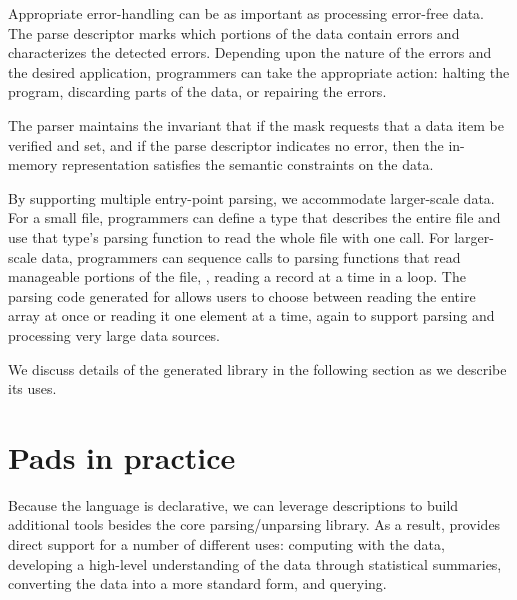 \documentclass{sig-alternate}
\begin{document}
Appropriate error-handling can be as important as processing
error-free data.  The parse descriptor marks which portions of the
data contain errors and characterizes the detected errors.
Depending upon the nature of the errors and the desired application,
programmers can take the appropriate action: halting the program,
discarding parts of the data, or repairing the errors.

The parser maintains the invariant that if the mask requests
that a data item be verified and set, and if the parse descriptor
indicates no error, then the in-memory representation satisfies the
semantic constraints on the data.

By supporting multiple entry-point parsing, we accommodate larger-scale data.
For a small file, programmers can define a \pads{} type that describes
the entire file and use that type's parsing function to read the whole
file with one call.  For larger-scale data, programmers can sequence
calls to parsing functions that read manageable portions of the file,
\eg{}, reading a record at a time in a loop.  The parsing code generated
for  allows users to choose between reading the entire array
at once or reading it one element at a time, again to support parsing
and processing very large data sources.

We discuss details of the generated library in the following section
as we describe its uses.

\section{Pads in practice}
Because the \pads{} language is declarative, we can leverage \pads{}
descriptions to build additional tools besides the core parsing/unparsing
library.  As a result, \pads{} provides direct support for a number
of different uses: computing with the data, developing a high-level
understanding of the data through statistical summaries, converting the data into a more standard form, and querying.  
\end{document}
